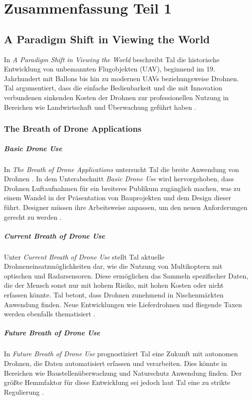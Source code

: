 \chapter{Zusammenfassung Teil 1}\label{ch:summary1}

\section{A Paradigm Shift in Viewing the World}
In \textit{A Paradigm Shift in Viewing the World} beschreibt Tal die historische Entwicklung von unbemannten Flugobjekten (UAV), beginnend im 19. Jahrhundert mit Ballons bis hin zu modernen UAVs beziehungsweise Drohnen.
Tal argumentiert, dass die einfache Bedienbarkeit und die mit Innovation verbundenen sinkenden Kosten der Drohnen zur professionellen Nutzung in Bereichen wie Landwirtschaft und Überwachung geführt haben \cite[p. 11]{Tal2021}.

\subsection{The Breath of Drone Applications}
\paragraph{Basic Drone Use}
In \textit{The Breath of Drone Applications} untersucht Tal die breite Anwendung von Drohnen \cite[p. 12]{Tal2021}.
In dem Unterabschnitt \textit{Basic Drone Use} wird hervorgehoben, dass Drohnen Luftaufnahmen für ein breiteres Publikum zugänglich machen, was zu einem Wandel in der Präsentation von Bauprojekten und dem Design dieser führt.
Designer müssen ihre Arbeitsweise anpassen, um den neuen Anforderungen gerecht zu werden \cite[p. 12]{Tal2021}.

\paragraph{Current Breath of Drone Use}
Unter \textit{Current Breath of Drone Use} stellt Tal aktuelle Drohneneinsatzmöglichkeiten dar, wie die Nutzung von Multikoptern mit optischen und Radarsensoren.
Diese ermöglichen das Sammeln spezifischer Daten, die der Mensch sonst nur mit hohem Risiko, mit hohen Kosten oder nicht erfassen könnte.
Tal betont, dass Drohnen zunehmend in Nischenmärkten Anwendung finden.
Neue Entwicklungen wie Lieferdrohnen und fliegende Taxen werden ebenfalls thematisiert \cite[pp. 13-15]{Tal2021}.

\paragraph{Future Breath of Drone Use}
In \textit{Future Breath of Drone Use} prognostiziert Tal eine Zukunft mit autonomen Drohnen, die Daten automatisiert erfassen und verarbeiten.
Dies könnte in Bereichen wie Baustellenüberwachung und Naturschutz Anwendung finden.
Der größte Hemmfaktor für diese Entwicklung sei jedoch laut Tal eine zu strikte Regulierung \cite[p. 16]{Tal2021}.

